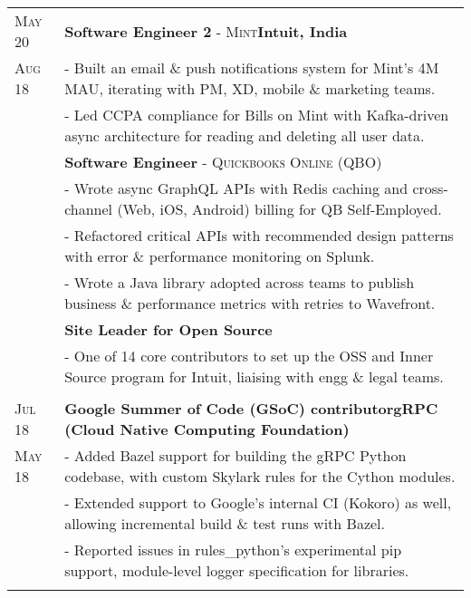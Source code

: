\documentclass[a4paper,10pt]{extarticle} %
\begin{document}
\begin{tabularx}{\linewidth}{ l | X }
\textsc{May 20} & \textbf{Software Engineer 2} \textsc{- Mint}\hfill\textbf{Intuit, India}\\
\textsc{Aug 18} & {- Built an email \& push notifications system for Mint's 4M MAU, iterating with PM, XD, mobile \& marketing teams.}\\
& {- Led CCPA compliance for Bills on Mint with Kafka-driven async architecture for reading and deleting all user data.}\\
& \textbf{Software Engineer} \textsc{- Quickbooks Online (QBO)}\\
& {- Wrote async GraphQL APIs with Redis caching and cross-channel (Web, iOS, Android) billing for QB Self-Employed.}\\
& {- Refactored critical APIs with recommended design patterns with error \& performance monitoring on Splunk.}\\
& {- Wrote a Java library adopted across teams to publish business \& performance metrics with retries to Wavefront.}\\
& \textbf{Site Leader for Open Source}\\
& {- One of 14 core contributors to set up the OSS and Inner Source program for Intuit, liaising with engg \& legal teams.}\\
\multicolumn{2}{c}{} \\

\textsc{Jul 18} & \textbf{Google Summer of Code (GSoC) contributor}\hfill\textbf{gRPC (Cloud Native Computing Foundation)}\\
\textsc{May 18}& {- Added Bazel support for building the gRPC Python codebase, with custom Skylark rules for the Cython modules.}\\
& {- Extended support to Google's internal CI (Kokoro) as well, allowing incremental build \& test runs with Bazel.}\\
& {- Reported issues in rules\_python's experimental pip support, module-level logger specification for libraries.}\\
\multicolumn{2}{c}{} \\



\end{tabularx}
\end{document}
